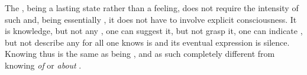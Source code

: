 
The , being a lasting state rather than a feeling, does
not require the intensity of such  and, being essentially
, it does not have to involve explicit consciousness. It is
knowledge, but not any , one can suggest it, but not grasp it, one
can indicate , but not describe any  for all one
 knows is  and its eventual expression is silence.
%
%
 Knowing thus
 is the same as being , 
and as such completely different from  knowing {\em of} or {\em
  about} .

